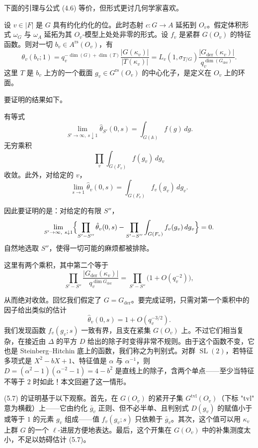 下面的引理与公式 (4.6) 等价，但形式更讨几何学家喜欢。

\begin{lemma}
\setcounter{theorem}{3}
设 $v\in|F|$ 是 $G$ 具有约化约化的位。此时态射 $c:G\to A$ 延拓到 $O_v$。假定体积形式 $\omega_G$ 与 $\omega_A$ 延拓为其 $O_v$-模型上处处非零的形式。设 $f_v$ 是紧群 $G(O_v)$ 的特征函数。则对一切 $b_v\in A^{\mathrm{rs}}(O_v)$，有
\begin{equation}\tag{5.5}
\theta_v(b_v;1)=q_v^{-\dim(G)+\dim(T)}\frac{|G(\kappa_v)|}{|T(\kappa_v)|}
=L_v(1,\sigma_{T/G})\frac{|G_{\mathrm{der}}(\kappa_v)|}{q_v^{\dim(G_{\mathrm{der}})}}.
\end{equation}
这里 $T$ 是 $b_v$ 上方的一个截面 $g_v\in G^{\mathrm{rs}}(O_v)$ 的中心化子，是定义在 $O_v$ 上的环面。
\end{lemma}

要证明的结果如下。

\begin{proposition}
\setcounter{theorem}{5}
有等式
\[
\lim_{S'\to\infty,\ s\downarrow1}\hat\theta_{S'}(0,s)=\int_{G(\mathbb A)}f(g)\,dg.
\]
无穷乘积
\[
\prod_v\int_{G(F_v)}f(g_v)\,dg_v
\]
收敛。此外，对给定的 $v$，
\[
\lim_{s\to1}\hat\theta_v(0,s)=\int_{G(F_v)}f_v(g_v)\,dg_v.
\]
\end{proposition}

因此要证明的是：对给定的有限 $S''$，
\[
\lim_{S'\to\infty,\ s\downarrow1}
\Bigl\{\prod_{S'-S''}\hat\theta_v(0,s)-\prod_{S'-S''}\int_{G(F_v)}f_v(g_v)\,dg_v\Bigr\}=0.
\]
自然地选取 $S''$，使得一切可能的麻烦都被排除。

这里有两个乘积，其中第二个等于
\[
\prod_{S'-S''}\frac{|G_{\mathrm{der}}(\kappa_v)|}{q_v^{\dim G_{\mathrm{der}}}}
=\prod_{S'-S''}\bigl(1+O(q_v^{-2})\bigr),
\]

从而绝对收敛。回忆我们假定了 $G=G_{\mathrm{der}}$。要完成证明，只需对第一个乘积中的因子给出类似的估计
\begin{equation}\tag{5.7}
\hat\theta_v(0,s)=1+O(q_v^{-3/2}).
\end{equation}
我们发现函数 $f_v(g_v;s)$ 一致有界，且支在紧集 $G(O_v)$ 上。不过它们相当复杂，在接近由 $\Delta$ 的平方 $D$ 给出的除子时变得非常不规则。由于这个函数不变，它也是 Steinberg–Hitchin 底上的函数，我们称之为判别式。对群 $\operatorname{SL}(2)$，若特征多项式是 $X^2-bX+1$、特征值是 $\alpha$ 与 $\alpha^{-1}$，则 $D=(\alpha^2-1)(\alpha^{-2}-1)=4-b^2$ 是直线上的除子，含两个单点——至少当特征不等于 $2$ 时如此！本文回避了这一情形。

(5.7) 的证明基于以下观察。首先，在 $G(O_v)$ 的紧开子集 $G^{\mathrm{tvl}}(O_v)$（下标 "tvl" 意为横截）上——它由约化 $\bar g_v$ 正则、但不必半单、且判别式 $D(g_v)$ 的赋值小于或等于 $1$ 的元素 $g_v$ 组成——值 $f_v(g_v;s)$ 只依赖于 $\bar g_v$。其次，这个值可以用 $\kappa_v$ 上群 $G$ 的一个 $\ell$-进层方便地表达。最后，这个开集在 $G(O_v)$ 中的补集测度太小，不足以妨碍估计 (5.7)。

